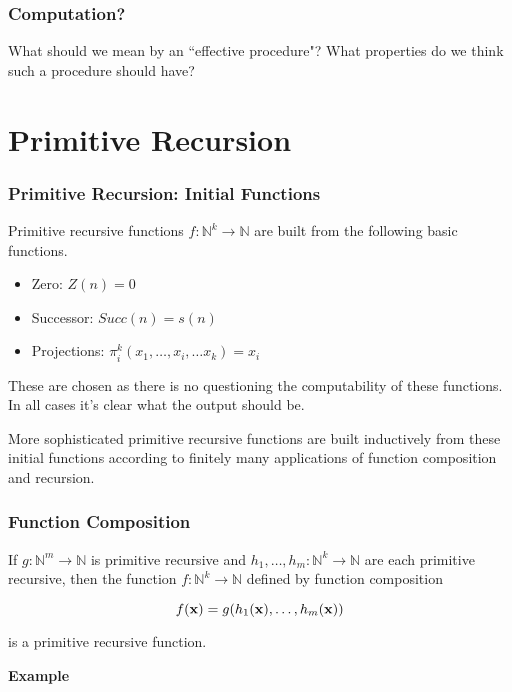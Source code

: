 \documentclass{beamer}
\theoremstyle{indentDefn} \newtheorem{defn}[]{Definition}
\begin{document}
\begin{frame}
	\frametitle{Computation?}

	What should we mean by an ``effective procedure"? What properties do we think such a procedure should have? 

	\vspace{6cm}

\end{frame}

\section{Primitive Recursion}

\begin{frame}
	\frametitle{Primitive Recursion: Initial Functions}

	Primitive recursive functions $f: \mathbb{N}^{k} \rightarrow \mathbb{N}$ are built from the following basic functions. 

	\vspace{0.5cm}

	\begin{itemize}
		\item[] Zero: $Z(n) = 0$
		\item[] Successor: $Succ(n) = s(n)$
		\item[] Projections: $\pi_{i}^{k}(x_{1},\dots, x_{i},\dots x_{k}) = x_{i}$
	\end{itemize}

	\vspace{0.5cm}

	These are chosen as there is no questioning the computability of these functions. In all cases it's clear what the output should be. 

	\vspace{0.5cm}

	More sophisticated primitive recursive functions are built inductively from these initial functions according to finitely many applications of function composition and recursion. 

\end{frame}

\begin{frame}
	\frametitle{Function Composition}

	If $g:\mathbb{N}^{m} \rightarrow \mathbb{N}$ is primitive recursive and $h_{1},\dots, h_{m}: \mathbb{N}^{k} \rightarrow \mathbb{N}$ are each primitive recursive, then the function $f:\mathbb{N}^{k} \rightarrow \mathbb{N}$ defined by function composition 

	$$f({\bf x}) = g(h_{1}({\bf x}),\dots , h_{m}({\bf x}))$$

	is a primitive recursive function. 

	\vspace{0.5cm}

	{\bf Example}
	\vspace{4cm}

\end{frame}
\end{document}
